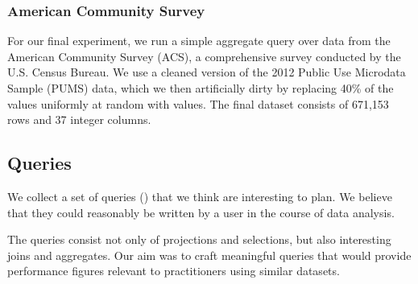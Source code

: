 \subsubsection{American Community Survey}
For our final experiment, we run a simple aggregate query over data from the American
Community Survey (ACS), a comprehensive survey conducted by the U.S.
Census Bureau. We use a cleaned version of the 2012 Public Use Microdata Sample (PUMS) data,
which we then artificially dirty by replacing 40\% of the values uniformly at random with
\nullv{} values.
The final dataset consists of 671,153 rows and 37 integer columns.

\subsection{Queries}
We collect a set of queries () that we think are interesting to plan.
We believe that they could reasonably be written by a user in the course of data analysis.

The queries consist not only of projections and selections, but also
interesting joins and aggregates. Our aim was to craft meaningful queries that would
provide performance figures relevant to practitioners using similar datasets.

%

